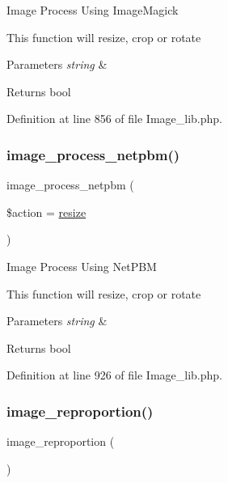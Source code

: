 Image Process Using Image\+Magick

This function will resize, crop or rotate


\begin{DoxyParams}{Parameters}
{\em string} & \\
\hline
\end{DoxyParams}
\begin{DoxyReturn}{Returns}
bool 
\end{DoxyReturn}


Definition at line 856 of file Image\+\_\+lib.\+php.

\mbox{\label{class_c_i___image__lib_ab40d1235dccf0611ef4fe5a6b0272dd3}} 
\subsubsection{\texorpdfstring{image\_process\_netpbm()}{image\_process\_netpbm()}}
{\footnotesize\ttfamily image\+\_\+process\+\_\+netpbm (\begin{DoxyParamCaption}\item[{}]{\$action = {\ttfamily \textquotesingle{}\mbox{\hyperlink{class_c_i___image__lib_a94e38a7d478ce07200a52c51497e598e}{resize}}\textquotesingle{}} }\end{DoxyParamCaption})}

Image Process Using Net\+P\+BM

This function will resize, crop or rotate


\begin{DoxyParams}{Parameters}
{\em string} & \\
\hline
\end{DoxyParams}
\begin{DoxyReturn}{Returns}
bool 
\end{DoxyReturn}


Definition at line 926 of file Image\+\_\+lib.\+php.

\mbox{\label{class_c_i___image__lib_a55ee590fb313c50e99d6c1d4cd9618d2}} 
\subsubsection{\texorpdfstring{image\_reproportion()}{image\_reproportion()}}
{\footnotesize\ttfamily image\+\_\+reproportion (\begin{DoxyParamCaption}{ }\end{DoxyParamCaption})}


